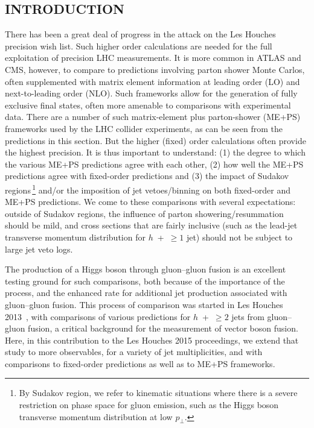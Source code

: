 \subsection{INTRODUCTION}
\label{sec:hjetscomp:intro}

There has been a great deal of progress in
the attack on the Les Houches precision wish list. Such higher order
calculations are needed for the full exploitation of precision LHC
measurements. It is more common in ATLAS and CMS, however, to compare
to predictions involving parton shower Monte Carlos, often
supplemented with matrix element information at leading order (LO) and
next-to-leading order (NLO). Such frameworks allow for the generation
of fully exclusive final states, often more amenable to comparisons
with experimental data. There are a number of such matrix-element plus
parton-shower (ME+PS) frameworks used by the LHC collider experiments,
as can be seen from the predictions in this section. But the higher
(fixed) order calculations often provide the highest precision. It is
thus important to understand: (1) the degree to which the various
ME+PS predictions agree with each other, (2) how well the ME+PS
predictions agree with fixed-order predictions and (3) the impact of
Sudakov regions\,\footnote{By Sudakov region, we refer to kinematic
situations where there is a severe restriction on phase space for
gluon emission, such as the Higgs boson transverse momentum
distribution at low $p_\perp$.} and/or the imposition of jet
vetoes/binning on both fixed-order and ME+PS predictions.  We come to
these comparisons with several expectations: outside of Sudakov regions, the
influence of parton showering/resummation should be mild, and cross
sections that are fairly inclusive (such as the lead-jet transverse
momentum distribution for $h$~+~$\ge1$ jet) should not be subject to
large jet veto logs.

The production of a Higgs boson through gluon--gluon fusion is an
excellent testing ground for such comparisons, both because of the
importance of the process, and the enhanced rate for additional jet
production associated with gluon--gluon fusion. This process of
comparison was started in Les Houches
2013~\cite{AlcarazMaestre:2012vp}, with comparisons of various
predictions for $h$~+~$\ge2$ jets from gluon--gluon fusion, a critical
background for the measurement of vector boson fusion. Here, in this
contribution to the Les Houches 2015 proceedings, we extend that study
to more observables, for a variety of jet multiplicities, and with
comparisons to fixed-order predictions as well as to ME+PS frameworks.

